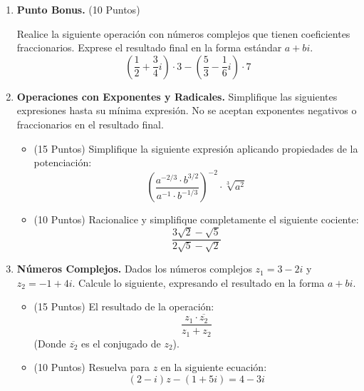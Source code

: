 \documentclass[12pt]{article}
\begin{document}
\begin{enumerate}
    \item \textbf{Punto Bonus.} (10 Puntos)

    Realice la siguiente operación con números complejos que tienen coeficientes fraccionarios. Exprese el resultado final en la forma estándar $a+bi$.
    \[
    \left( \frac{1}{2} + \frac{3}{4}i \right)\cdot 3 - \left( \frac{5}{3} - \frac{1}{6}i \right)\cdot 7
    \]



    \item \textbf{Operaciones con Exponentes y Radicales.} Simplifique las siguientes expresiones hasta su mínima expresión. No se aceptan exponentes negativos o fraccionarios en el resultado final.

    \begin{itemize}
        \item[a)] (15 Puntos) Simplifique la siguiente expresión aplicando propiedades de la potenciación:
        \[
        \left( \frac{a^{-2/3} \cdot b^{3/2}}{a^{-1} \cdot b^{-1/3}} \right)^{-2} \cdot \sqrt[3]{a^2}
        \]

        \item[b)] (10 Puntos) Racionalice y simplifique completamente el siguiente cociente:
        \[
        \frac{3\sqrt{2} - \sqrt{5}}{2\sqrt{5} - \sqrt{2}}
        \]
    \end{itemize}

    \vspace{0.5cm}

    \item \textbf{Números Complejos.} Dados los números complejos $z_1 = 3 - 2i$ y $z_2 = -1 + 4i$. Calcule lo siguiente, expresando el resultado en la forma $a+bi$.

    \begin{itemize}
        \item[a)] (15 Puntos) El resultado de la operación:
        \[
        \frac{z_1 \cdot \overline{z_2}}{z_1 + z_2}
        \]
        (Donde $\overline{z_2}$ es el conjugado de $z_2$).

        \item[b)] (10 Puntos) Resuelva para $z$ en la siguiente ecuación:
        \[
        (2-i)z - (1+5i) = 4 - 3i
        \]
    \end{itemize}


\end{enumerate}
\end{document}
